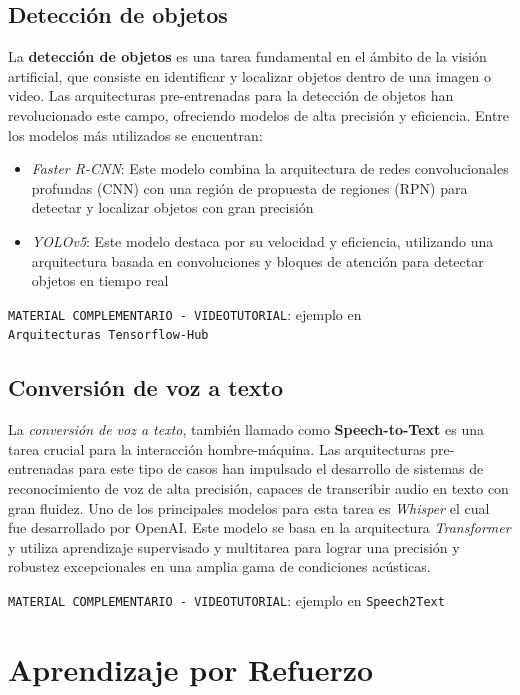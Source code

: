 \documentclass[
  a4paper,
  DIV=11,
  numbers=noendperiod]{scrreprt}
\providecommand{\tightlist}{%
  \setlength{\itemsep}{0pt}\setlength{\parskip}{0pt}}\usepackage{longtable,booktabs,array}
\begin{document}
\subsection{Detección de objetos}\label{detecciuxf3n-de-objetos}

La \textbf{detección de objetos} es una tarea fundamental en el ámbito
de la visión artificial, que consiste en identificar y localizar objetos
dentro de una imagen o video. Las arquitecturas pre-entrenadas para la
detección de objetos han revolucionado este campo, ofreciendo modelos de
alta precisión y eficiencia. Entre los modelos más utilizados se
encuentran:

\begin{itemize}
\tightlist
\item
  \emph{Faster R-CNN}: Este modelo combina la arquitectura de redes
  convolucionales profundas (CNN) con una región de propuesta de
  regiones (RPN) para detectar y localizar objetos con gran precisión
\item
  \emph{YOLOv5}: Este modelo destaca por su velocidad y eficiencia,
  utilizando una arquitectura basada en convoluciones y bloques de
  atención para detectar objetos en tiempo real
\end{itemize}

\texttt{MATERIAL\ COMPLEMENTARIO\ -\ VIDEOTUTORIAL}: ejemplo en
\texttt{Arquitecturas\ Tensorflow-Hub}

\subsection{Conversión de voz a
texto}\label{conversiuxf3n-de-voz-a-texto}

La \emph{conversión de voz a texto}, también llamado como
\textbf{Speech-to-Text} es una tarea crucial para la interacción
hombre-máquina. Las arquitecturas pre-entrenadas para este tipo de casos
han impulsado el desarrollo de sistemas de reconocimiento de voz de alta
precisión, capaces de transcribir audio en texto con gran fluidez. Uno
de los principales modelos para esta tarea es \emph{Whisper} el cual fue
desarrollado por OpenAI. Este modelo se basa en la arquitectura
\emph{Transformer} y utiliza aprendizaje supervisado y multitarea para
lograr una precisión y robustez excepcionales en una amplia gama de
condiciones acústicas.

\texttt{MATERIAL\ COMPLEMENTARIO\ -\ VIDEOTUTORIAL}: ejemplo en
\texttt{Speech2Text}

\section{Aprendizaje por Refuerzo}\label{aprendizaje-por-refuerzo}
\end{document}
